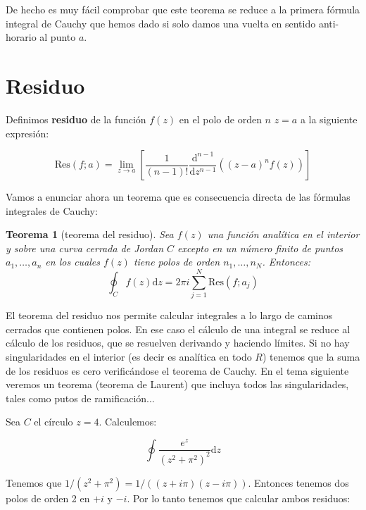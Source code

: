 \documentclass[12pt,a4paper]{book}
\newcommand{\parentesis}[1]{\left( #1  \right)}
\newcommand{\ccorchetes}[1]{\left[ #1  \right]}
\newcommand{\D}{\mathrm{d}}
\newcommand{\Res}{\mathrm{Res}}
\newtheorem{theorem}{Teorema}[section]
\begin{document}
De hecho es muy fácil comprobar que este teorema se reduce a la primera fórmula integral de Cauchy que hemos dado si solo damos una vuelta en sentido anti-horario al punto $a$.

\section{Residuo}

Definimos \textbf{residuo} de la función $f(z)$ en el polo de orden $n$ $z=a$ a la siguiente expresión:

\begin{equation}
\Res (f;a) = \lim_{z \rightarrow a} \ccorchetes{\dfrac{1}{(n-1)!} \dfrac{\D^{n-1}}{\D z^{n-1}} \parentesis{(z-a)^n f(z)}}
\end{equation}

Vamos a enunciar ahora un teorema que es consecuencia directa de las fórmulas integrales de Cauchy:

\begin{theorem}[teorema del residuo]
Sea $f(z)$ una función analítica en el interior y sobre una curva cerrada de Jordan $C$ excepto en un número finito de puntos $a_1,\ldots,a_n$ en los cuales $f(z)$ tiene polos de orden $n_1,\ldots,n_N$. Entonces:
$$ \oint_C f(z) \D z = 2 \pi i \sum_{j=1}^N \Res (f;a_j) $$
\end{theorem}

El teorema del residuo nos permite calcular integrales a lo largo de caminos cerrados que contienen polos. En ese caso el cálculo de una integral se reduce al cálculo de los residuos, que se resuelven derivando y haciendo límites. Si no hay singularidades en el interior (es decir es analítica en todo $R$) tenemos que la suma de los residuos es cero verificándose el teorema de Cauchy. En el tema siguiente veremos un teorema (teorema de Laurent) que incluya todos las singularidades, tales como putos de ramificación... \\




\hrulefill

Sea $C$ el círculo $z=4$. Calculemos:

\begin{equation}
\oint  \frac{e^z}{(z^2+\pi^2)^2} \D z
\end{equation}

Tenemos que $1/(z^2+\pi^2) = 1/((z+i\pi)(z-i \pi))$. Entonces tenemos dos polos de orden 2 en $+i$ y $-i$. Por lo tanto tenemos que calcular ambos residuos:
\end{document}
